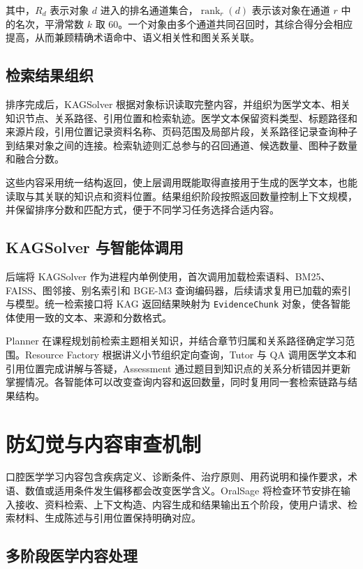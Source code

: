 其中，\(R_d\) 表示对象 \(d\) 进入的排名通道集合，\(\operatorname{rank}_r(d)\) 表示该对象在通道 \(r\) 中的名次，平滑常数 \(k\) 取 60。一个对象由多个通道共同召回时，其综合得分会相应提高，从而兼顾精确术语命中、语义相关性和图关系关联。

\subsection{检索结果组织}

排序完成后，KAGSolver 根据对象标识读取完整内容，并组织为医学文本、相关知识节点、关系路径、引用位置和检索轨迹。医学文本保留资料类型、标题路径和来源片段，引用位置记录资料名称、页码范围及局部片段，关系路径记录查询种子到结果对象之间的连接。检索轨迹则汇总参与的召回通道、候选数量、图种子数量和融合分数。

这些内容采用统一结构返回，使上层调用既能取得直接用于生成的医学文本，也能读取与其关联的知识点和资料位置。结果组织阶段按照返回数量控制上下文规模，并保留排序分数和匹配方式，便于不同学习任务选择合适内容。

\subsection{KAGSolver 与智能体调用}

后端将 KAGSolver 作为进程内单例使用，首次调用加载检索语料、BM25、FAISS、图邻接、别名索引和 BGE-M3 查询编码器，后续请求复用已加载的索引与模型。统一检索接口将 KAG 返回结果映射为 \texttt{EvidenceChunk} 对象，使各智能体使用一致的文本、来源和分数格式。

Planner 在课程规划前检索主题相关知识，并结合章节归属和关系路径确定学习范围。Resource Factory 根据讲义小节组织定向查询，Tutor 与 QA 调用医学文本和引用位置完成讲解与答疑，Assessment 通过题目到知识点的关系分析错因并更新掌握情况。各智能体可以改变查询内容和返回数量，同时复用同一套检索链路与结果结构。

\section{防幻觉与内容审查机制}

口腔医学学习内容包含疾病定义、诊断条件、治疗原则、用药说明和操作要求，术语、数值或适用条件发生偏移都会改变医学含义。OralSage 将检查环节安排在输入接收、资料检索、上下文构造、内容生成和结果输出五个阶段，使用户请求、检索材料、生成陈述与引用位置保持明确对应。

\subsection{多阶段医学内容处理}


